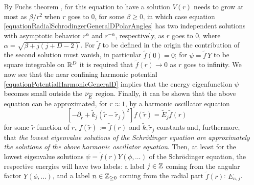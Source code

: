 By Fuchs theorem \cite{}, for this equation to have a solution $V(r)$ needs to grow at most as $\beta/r^2$ when $r$ goes to $0$, for some $\beta \geq 0$, in which case equation \eqref{equationRadialSchrodingerGeneralDPolarAngles} has two independent solutions with asymptotic behavior $r^\alpha$ and $r^{-\alpha}$, respectively, as $r$ goes to $0$, where $\alpha = \sqrt{\beta + j(j+D-2)}$. For $\tilde f$ to be defined in the origin the contribution of the second solution must vanish, in particular $\tilde f(0) = 0$; for $\psi = \tilde f\, Y$ to be square integrable on $\mathbb{R}^D$ it is required that $\tilde f(r) \to 0$ as $r$ goes to infinity.
We now see that the near confining harmonic potential \eqref{equationPotentialHarmonicGeneralD} implies that the energy eigenfunction $\psi$ becomes small outside the $\nu_{\overline{E}}$ region.
Finally, it can be shown \cite{Fiore2019} that the above equation can be approximated, for $r \approx 1$, by a harmonic oscillator equation
\begin{equation} \label{harmonicApproximationRadialSolutionGeneralD}
    [- \partial_{\tilde r} + \tilde k_j(\tilde r - \tilde r_{j})^2] f(\tilde r) = \tilde E_j \tilde f(r)
\end{equation} 
for some $\tilde r$ function of $r$, $f(\tilde r) := \tilde f(r)$ and $\tilde k, \tilde r_j$ constants and, furthermore, that \emph{the lowest eigenvalue solutions of the Schr\"odinger equation are approximately the solutions of the above harmonic oscillator equation}. Then, at least for the lowest eigenvalue solutions $\psi = \tilde f(r) Y(\phi, \dots)$ of the Schr\"odinger equation, the respective energies will have two labels: a label $j \in \mathbb{Z}$ coming from the angular factor $Y(\phi, \dots)$, and a label $n \in \mathbb{Z}_{\geq 0}$ coming from the radial part $\tilde f(r)$: $E_{n, j}$.

\lin


